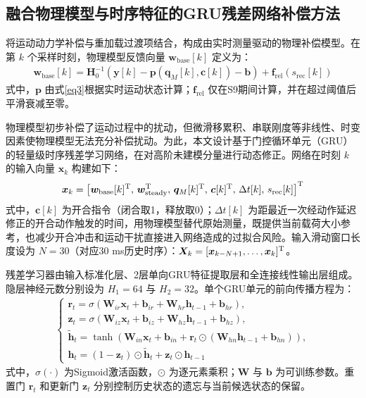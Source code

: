 \documentclass{JQRnew}
\begin{document}
\subsection{融合物理模型与时序特征的GRU残差网络补偿方法}

将运动动力学补偿与重加载过渡项结合，构成由实时测量驱动的物理补偿模型。在第 $k$ 个采样时刻，物理模型反馈向量 $\bm{w}_{\text{base}}[k]$ 定义为：
\begin{align}
	\label{eq12}
	\bm{w}_{\text{base}}[k] = \bm{H}_0^{-1}(\bm{y}[k] - \bm{p}(\bm{q}_M[k],\bm{c}[k]) - \bm{b}) + \bm{f}_{\text{rel}}(s_{\text{rec}}[k])
\end{align}
式中，$\bm{p}$ 由式\eqref{eq3}根据实时运动状态计算；$\bm{f}_{\text{rel}}$ 仅在S9期间计算，并在超过阈值后平滑衰减至零。

物理模型初步补偿了运动过程中的扰动，但微滑移累积、串联刚度等非线性、时变因素使物理模型无法充分补偿扰动。为此，本文设计基于门控循环单元（GRU）的轻量级时序残差学习网络，在对高阶未建模分量进行动态修正。网络在时刻 $k$ 的输入向量 $\bm{x}_k$ 构建如下：
\begin{align}
	\label{eq13}
	\bm{x}_k = \left[\bm{w}_{\text{base}}[k]^{\rm T},\, \bm{w}_{\text{steady}}^{\rm T},\, \bm{q}_M[k]^{\rm T},\, \bm{c}[k]^{\rm T},\, \Delta t[k],\, s_{\text{rec}}[k]\right]^{\rm T}
\end{align}
式中，$\bm{c}[k]$ 为开合指令（闭合取1，释放取0）；$\Delta t[k]$ 为距最近一次经动作延迟修正的开合动作触发的时间，用物理模型替代原始测量，既提供当前载荷大小参考，也减少开合冲击和运动干扰直接进入网络造成的过拟合风险。输入滑动窗口长度设为 $N=30$（对应30 ms历史时序）：$\bm{X}_k = [\bm{x}_{k-N+1},\ldots,\bm{x}_k]^{\rm T}$。

残差学习器由输入标准化层、2层单向GRU特征提取层和全连接线性输出层组成。隐层神经元数分别设为 $H_1=64$ 与 $H_2=32$。单个GRU单元的前向传播方程为：
\begin{align}
	\label{eq14}
	\begin{cases}
		\bm{r}_t = \sigma(\bm{W}_{ir}\bm{x}_t + \bm{b}_{ir} + \bm{W}_{hr}\bm{h}_{t-1} + \bm{b}_{hr}), \\
		\bm{z}_t = \sigma(\bm{W}_{iz}\bm{x}_t + \bm{b}_{iz} + \bm{W}_{hz}\bm{h}_{t-1} + \bm{b}_{hz}), \\
		\widetilde{\bm{h}}_t = \tanh(\bm{W}_{in}\bm{x}_t + \bm{b}_{in} + \bm{r}_t \odot (\bm{W}_{hn}\bm{h}_{t-1} + \bm{b}_{hn})), \\
		\bm{h}_t = (1 - \bm{z}_t) \odot \widetilde{\bm{h}}_t + \bm{z}_t \odot \bm{h}_{t-1}
	\end{cases}
\end{align}
式中，$\sigma(\cdot)$ 为Sigmoid激活函数，$\odot$ 为逐元素乘积；$\bm{W}$ 与 $\bm{b}$ 为可训练参数。重置门 $\bm{r}_t$ 和更新门 $\bm{z}_t$ 分别控制历史状态的遗忘与当前候选状态的保留。
\end{document}

